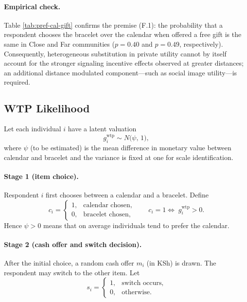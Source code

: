 \documentclass[12pt,a4paper]{article}
\begin{document}
\paragraph{Empirical check.}
Table \ref{tab:pref-cal-gift} confirms the premise (F.1): the probability that a respondent chooses the bracelet over the calendar when offered a free gift is the same in Close and Far communities ($p=0.40$ and $p=0.49$, respectively).  Consequently, heterogeneous substitution in private utility cannot by itself account for the stronger signaling incentive effects observed at greater distances; an additional distance modulated component—such as social image utility—is required.

\newpage 


\FloatBarrier
\newpage



\setcounter{table}{0}
\renewcommand{\thetable}{H\arabic{table}}

\setcounter{figure}{0}
\renewcommand{\thefigure}{H\arabic{figure}}


\renewcommand{\thesubsection}{\Alph{subsection}}

\subsection{WTP Likelihood}\label{sec:wtp-model}

Let each individual \(i\) have a latent valuation
\[
  g_i^{\text{wtp}}\sim N\!\bigl(\psi,\,1\bigr),
\]
where \(\psi\) (to be estimated) is the mean difference in monetary value between calendar and bracelet and the variance is fixed at one for scale identification.

\paragraph{Stage 1 (item choice).}
Respondent \(i\) first chooses between a calendar and a bracelet.  Define
\[
  c_i =
  \begin{cases}
    1, & \text{calendar chosen},\\
    0, & \text{bracelet chosen},
  \end{cases}
\qquad
c_i=1 \Longleftrightarrow\; g_i^{\text{wtp}}>0 .
\]
Hence \(\psi>0\) means that on average individuals tend to prefer the calendar.

\paragraph{Stage 2 (cash offer and switch decision).}
After the initial choice, a random cash offer \(m_i\) (in KSh) is drawn.  The respondent may switch to the other item.  Let
\[
  s_i =
  \begin{cases}
    1, & \text{switch occurs},\\
    0, & \text{otherwise}.
  \end{cases}
\]
\end{document}
